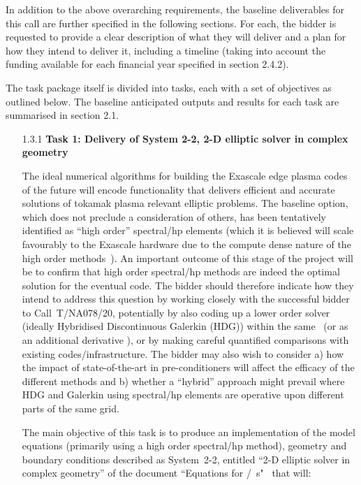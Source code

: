 In addition to the above overarching requirements, the baseline deliverables for 
this call are further specified in the following sections. For each, the bidder 
is requested to provide a clear description of what they will deliver and a plan 
for how they intend to deliver it, including a timeline (taking into account the 
funding available for each financial year specified in section 2.4.2).

The task package itself is divided into tasks, each with a set of objectives as 
outlined below. The baseline anticipated outputs and results for each task are 
summarised in section 2.1. 

\begin{itemize}
\item[1.3.1]\textbf{Task 1: Delivery of System 2-2, 2-D elliptic solver in complex geometry}

The ideal numerical algorithms for building the Exascale edge plasma codes of the 
future will encode functionality that delivers efficient and accurate solutions 
of tokamak plasma relevant elliptic problems. The baseline option, which does 
not preclude a consideration of others, has been tentatively identified as ``high 
order'' spectral/hp elements (which it is believed will scale favourably to the Exascale 
hardware due to the compute dense nature of the high order methods~\cite{pappeqs}). An important 
outcome of this stage of the project will be to confirm that high order spectral/hp 
methods are indeed the optimal solution for the eventual code. The bidder should 
therefore indicate how they intend to address this question by working closely 
with the successful bidder to Call~T/NA078/20, potentially by also coding up a lower order 
solver (ideally Hybridised Discontinuous Galerkin (HDG)) within the same \Papp \ 
(or as an additional derivative \Papp ), or by making careful quantified comparisons 
with existing codes/infrastructure. The bidder may also wish to consider a) how 
the impact of state-of-the-art in pre-conditioners will affect the efficacy of 
the different methods and b) whether a ``hybrid'' approach might prevail where 
HDG and Galerkin using spectral/hp elements are operative upon different parts 
of the same grid.

The main objective of this task is to produce an implementation of the model equations 
(primarily using a high order spectral/hp method), geometry and boundary conditions described 
as System~2-2, entitled ``2-D elliptic solver in complex geometry'' of the document
``Equations for \exc/\nep \ \Papp s"~\cite{pappeqs} that will: 


\end{itemize}
